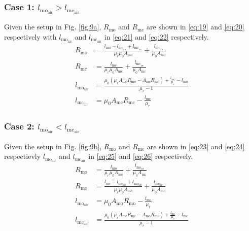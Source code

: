 \documentclass[lettersize,journal]{IEEEtran}
\begin{document}
\subsubsection*{\textup{Case 1: $l_{\mathrm{mo}_{\mathrm{air}}} > l_{\mathrm{mc}_{\mathrm{air}}}$}}
Given the setup in Fig. \ref{fig:9a}, $R_{\mathrm{mo}}$ and $R_{\mathrm{mc}}$ are shown in \eqref{eq:19} and \eqref{eq:20} respectively with $l_{\mathrm{mo}_{\mathrm{air}}}$ and $l_{\mathrm{mc}_{\mathrm{air}}}$ in \eqref{eq:21} and \eqref{eq:22} respectively.  
\begin{align}
R_{\mathrm{mo}} &= \frac{l_{\mathrm{mo}} - l_{\mathrm{mo}_{\mathrm{air}}} + l_{\mathrm{mc}_{\mathrm{air}}}}{\mu_r \mu_0 A_{\mathrm{mo}}} + \frac{l_{\mathrm{mo}_{\mathrm{air}}}}{\mu_0 A_{\mathrm{mo}}} \label{eq:19}\\
R_{\mathrm{mc}} &= \frac{l_{\mathrm{mc}}}{\mu_r \mu_0 A_{\mathrm{mc}}} + \frac{l_{\mathrm{mc}_{\mathrm{air}}}}{\mu_0 A_{\mathrm{mc}}} \label{eq:20}\\
l_{\mathrm{mo}_{\mathrm{air}}} &= \frac{\mu_0 (\mu_r A_{\mathrm{mo}} R_{\mathrm{mo}} - A_{\mathrm{mc}} R_{\mathrm{mc}}) + \frac{l_{\mathrm{mc}}}{\mu_r} - l_{\mathrm{mo}}}{\mu_r - 1} \label{eq:21}\\
l_{\mathrm{mc}_{\mathrm{air}}} &= \mu_0 A_{\mathrm{mc}} R_{\mathrm{mc}} - \frac{l_{\mathrm{mc}}}{\mu_r} \label{eq:22}
\end{align}

\subsubsection*{\textup{Case 2: $l_{\mathrm{mo}_{\mathrm{air}}} < l_{\mathrm{mc}_{\mathrm{air}}}$}}
Given the setup in Fig. \ref{fig:9b}, $R_{\mathrm{mo}}$ and $R_{\mathrm{mc}}$ are shown in \eqref{eq:23} and \eqref{eq:24} respectievly $l_{\mathrm{mo}_{\mathrm{air}}}$ and $l_{\mathrm{mc}_{\mathrm{air}}}$ in \eqref{eq:25} and \eqref{eq:26} respectively.
\begin{align}
R_{\mathrm{mo}} &= \frac{l_{\mathrm{mo}}}{\mu_r \mu_0 A_{\mathrm{mo}}} + \frac{l_{\mathrm{mo}_{\mathrm{air}}}}{\mu_0 A_{\mathrm{mo}}} \label{eq:23}\\
R_{\mathrm{mc}} &= \frac{l_{\mathrm{mc}} - l_{\mathrm{mc}_{\mathrm{air}}} + l_{\mathrm{mo}_{\mathrm{air}}}}{\mu_r \mu_0 A_{\mathrm{mc}}} + \frac{l_{\mathrm{mc}_{\mathrm{air}}}}{\mu_0 A_{\mathrm{mc}}} \label{eq:24}\\
l_{\mathrm{mo}_{\mathrm{air}}} &= \mu_0 A_{\mathrm{mo}} R_{\mathrm{mo}} - \frac{l_{\mathrm{mo}}}{\mu_r} \label{eq:25}\\
l_{\mathrm{mc}_{\mathrm{air}}} &= \frac{\mu_0 (\mu_r A_{\mathrm{mc}} R_{\mathrm{mc}} - A_{\mathrm{mo}} R_{\mathrm{mo}}) + \frac{l_{\mathrm{mo}}}{\mu_r} - l_{\mathrm{mc}}}{\mu_r - 1} \label{eq:26}
\end{align}
\end{document}
